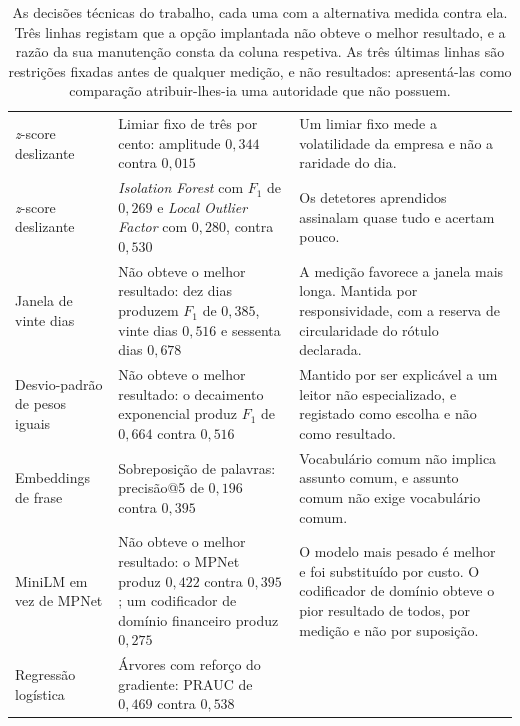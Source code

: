 \begin{table}[!htbp]
\caption[Cada escolha, contra a alternativa que não ficou]{As decisões técnicas do trabalho, cada uma
com a alternativa medida contra ela. Três linhas registam que a opção implantada não obteve o melhor
resultado, e a razão da sua manutenção consta da coluna respetiva. As três últimas linhas são
restrições fixadas antes de qualquer medição, e não resultados: apresentá-las como comparação
atribuir-lhes-ia uma autoridade que não possuem.}
\label{tab:av_alternativas}
\centering
\scriptsize
\begin{tabular}{L{0.19\textwidth} L{0.30\textwidth} L{0.39\textwidth}}
\toprule
{} &  &  \\
\midrule
\emph{z}-score deslizante & Limiar fixo de três por cento: amplitude $0{,}344$ contra $0{,}015$ &
Um limiar fixo mede a volatilidade da empresa e não a raridade do dia. \\
\addlinespace
\emph{z}-score deslizante & \emph{Isolation Forest} com $F_1$ de $0{,}269$ e \emph{Local Outlier
Factor} com $0{,}280$, contra $0{,}530$ & Os detetores aprendidos assinalam quase tudo e acertam
pouco. \\
\addlinespace
Janela de vinte dias & Não obteve o melhor resultado: dez dias produzem $F_1$ de $0{,}385$, vinte
dias $0{,}516$ e sessenta dias $0{,}678$ & A medição favorece a janela mais longa. Mantida por
responsividade, com a reserva de circularidade do rótulo declarada. \\
\addlinespace
Desvio-padrão de pesos iguais & Não obteve o melhor resultado: o decaimento exponencial produz $F_1$
de $0{,}664$ contra $0{,}516$ & Mantido por ser explicável a um leitor não especializado, e
registado como escolha e não como resultado. \\
\addlinespace
Embeddings de frase & Sobreposição de palavras: precisão@5 de $0{,}196$ contra $0{,}395$ &
Vocabulário comum não implica assunto comum, e assunto comum não exige vocabulário comum. \\
\addlinespace
MiniLM em vez de MPNet & Não obteve o melhor resultado: o MPNet produz $0{,}422$ contra $0{,}395$; um
codificador de domínio financeiro produz $0{,}275$ & O modelo mais pesado é melhor e foi substituído
por custo. O codificador de domínio obteve o pior resultado de todos, por medição e não por
suposição. \\
\addlinespace
Regressão logística & Árvores com reforço do gradiente: \gls{PRAUC} de $0{,}469$ contra $0{,}538$ &

\end{tabular}
\end{table}
